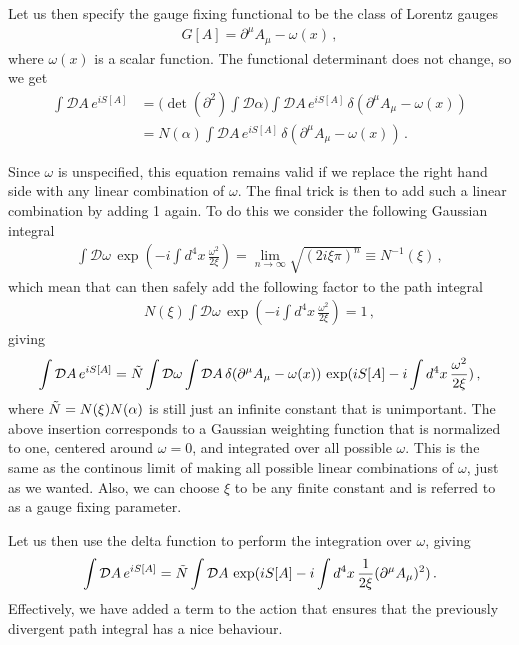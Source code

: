 Let us then specify the gauge fixing functional to be the class of Lorentz gauges 
\begin{align}
    G[A]=\partial^{\mu}A_{\mu}-\omega(x)\,,
\end{align}
where $\omega(x)$ is a scalar function. The functional determinant does not change, so we get
\begin{align}
    \int\mathcal{D}A\,e^{iS[A]}&=\Big(\det(\partial^{2})\int\mathcal{D}\alpha\Big)\int\mathcal{D}A\,e^{iS[A]}\,\delta(\partial^{\mu}A_{\mu}-\omega(x))\nonumber
    \\
    &=N(\alpha)\int\mathcal{D}A\,e^{iS[A]}\,\delta(\partial^{\mu}A_{\mu}-\omega(x))\,.
\end{align}

Since $\omega$ is unspecified, this equation remains valid if we replace the right hand side with any linear combination of $\omega$. The final trick is then to add such a linear combination by adding 1 again. To do this we consider the following Gaussian integral
\begin{align}
    \int\mathcal{D}\omega\,\exp(-i\int d^{4}x\,\frac{\omega^{2}}{2\xi})=\lim_{n\to\infty}\sqrt{(2i\xi\pi)^{n}}\equiv N^{-1}(\xi)\,,
\end{align}
which mean that can then safely add the following factor to the path integral
\begin{align}\label{eq:gaussian weigh in quantization}
    N(\xi)\int\mathcal{D}\omega\,\exp(-i\int d^{4}x\,\frac{\omega^{2}}{2\xi})=1\,,
\end{align}
giving
\begin{align}
    \int\mathcal{D}A\,e^{iS[A]}=\Tilde{N}\int\mathcal{D}\omega\int\mathcal{D}A\,\delta(\partial^{\mu}A_{\mu}-\omega(x))\,\exp(iS[A]-i\int d^{4}x\,\frac{\omega^{2}}{2\xi})\,,
\end{align}
where $\Tilde{N}=N(\xi)N(\alpha)$ is still just an infinite constant that is unimportant. The above insertion corresponds to a Gaussian weighting function that is normalized to one, centered around $\omega=0$, and integrated over all possible $\omega$. This is the same as the continous limit of making all possible linear combinations of $\omega$, just as we wanted. Also, we can choose $\xi$ to be any finite constant and is referred to as a gauge fixing parameter.

Let us then use the delta function to perform the integration over $\omega$, giving
\begin{align}
    \int\mathcal{D}A\,e^{iS[A]}=\Tilde{N}\int\mathcal{D}A\,\exp(iS[A]-i\int d^{4}x\,\frac{1}{2\xi}(\partial^{\mu}A_{\mu})^{2})\,.
\end{align}
Effectively, we have added a term to the action that ensures that the previously divergent path integral has a nice behaviour. 

